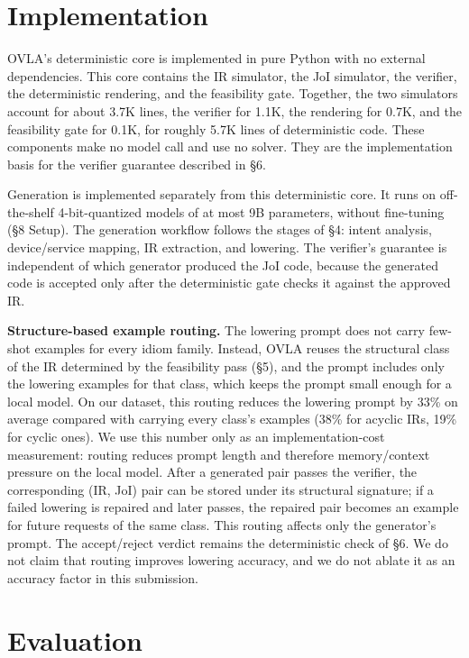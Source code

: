 \documentclass[sigconf,nonacm,anonymous,review]{acmart}
\begin{document}
\section{Implementation}

OVLA's deterministic core is implemented in pure Python with no external dependencies. This core contains the IR simulator, the JoI simulator, the verifier, the deterministic rendering, and the feasibility gate. Together, the two simulators account for about 3.7K lines, the verifier for 1.1K, the rendering for 0.7K, and the feasibility gate for 0.1K, for roughly 5.7K lines of deterministic code. These components make no model call and use no solver. They are the implementation basis for the verifier guarantee described in \S6.

Generation is implemented separately from this deterministic core. It runs on off-the-shelf 4-bit-quantized models of at most 9B parameters, without fine-tuning (\S8 Setup). The generation workflow follows the stages of \S4: intent analysis, device/service mapping, IR extraction, and lowering. The verifier's guarantee is independent of which generator produced the JoI code, because the generated code is accepted only after the deterministic gate checks it against the approved IR.

\textbf{Structure-based example routing.} The lowering prompt does not carry few-shot examples for every idiom family. Instead, OVLA reuses the structural class of the IR determined by the feasibility pass (\S5), and the prompt includes only the lowering examples for that class, which keeps the prompt small enough for a local model. On our dataset, this routing reduces the lowering prompt by 33\% on average compared with carrying every class's examples (38\% for acyclic IRs, 19\% for cyclic ones). We use this number only as an implementation-cost measurement: routing reduces prompt length and therefore memory/context pressure on the local model. After a generated pair passes the verifier, the corresponding (IR, JoI) pair can be stored under its structural signature; if a failed lowering is repaired and later passes, the repaired pair becomes an example for future requests of the same class. This routing affects only the generator's prompt. The accept/reject verdict remains the deterministic check of \S6. We do not claim that routing improves lowering accuracy, and we do not ablate it as an accuracy factor in this submission.

\section{Evaluation}
\end{document}
